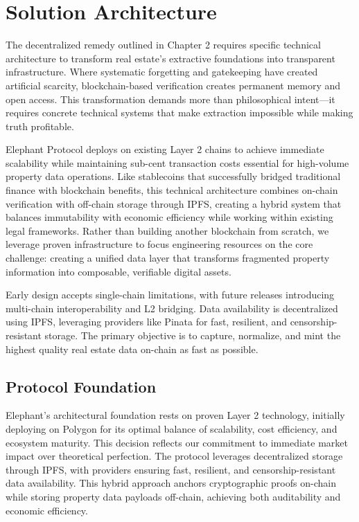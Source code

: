 \chapter{Solution Architecture}

The decentralized remedy outlined in Chapter 2 requires specific technical architecture to transform real estate's extractive foundations into transparent infrastructure. Where systematic forgetting and gatekeeping have created artificial scarcity, blockchain-based verification creates permanent memory and open access. This transformation demands more than philosophical intent---it requires concrete technical systems that make extraction impossible while making truth profitable.

Elephant Protocol deploys on existing Layer 2 chains to achieve immediate scalability while maintaining sub-cent transaction costs essential for high-volume property data operations. Like stablecoins that successfully bridged traditional finance with blockchain benefits, this technical architecture combines on-chain verification with off-chain storage through IPFS, creating a hybrid system that balances immutability with economic efficiency while working within existing legal frameworks. Rather than building another blockchain from scratch, we leverage proven infrastructure to focus engineering resources on the core challenge: creating a unified data layer that transforms fragmented property information into composable, verifiable digital assets.

Early design accepts single-chain limitations, with future releases introducing multi-chain interoperability and L2 bridging. Data availability is decentralized using IPFS, leveraging providers like Pinata for fast, resilient, and censorship-resistant storage. The primary objective is to capture, normalize, and mint the highest quality real estate data on-chain as fast as possible.

\section{Protocol Foundation}

Elephant's architectural foundation rests on proven Layer 2 technology, initially deploying on Polygon for its optimal balance of scalability, cost efficiency, and ecosystem maturity. This decision reflects our commitment to immediate market impact over theoretical perfection. The protocol leverages decentralized storage through IPFS, with providers ensuring fast, resilient, and censorship-resistant data availability. This hybrid approach anchors cryptographic proofs on-chain while storing property data payloads off-chain, achieving both auditability and economic efficiency.

